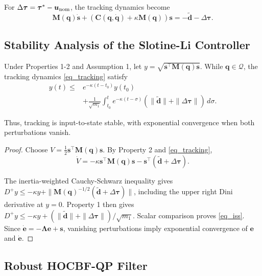 For $\Delta\bm\tau=\bm\tau^*-\bm u_{\rm nom}$, the tracking dynamics become
\begin{equation}
\bm M(\bm q)\dot{\bm s}+(\bm C(\bm q,\dot{\bm q})+\kappa\bm M(\bm q))\bm s
=-\tilde{\bm d}-\Delta\bm\tau.
\label{eq_tracking}
\end{equation}

\subsection{Stability Analysis of the Slotine-Li Controller}

\begin{theorem}
Under Properties 1-2 and Assumption 1, let
$y=\sqrt{\bm s^\top\bm M(\bm q)\bm s}$.
While $\bm q\in\mathcal Q$, the tracking dynamics
\eqref{eq_tracking} satisfy
\begin{equation}
\begin{aligned}
y(t)\le{}&e^{-\kappa(t-t_0)}y(t_0)\\
&+\frac{1}{\sqrt{m_1}}\int_{t_0}^{t}
e^{-\kappa(t-\sigma)}
(\|\tilde{\bm d}\|+\|\Delta\bm\tau\|)\,d\sigma.
\end{aligned}
\label{eq_iss}
\end{equation}

Thus, tracking is input-to-state stable, with
exponential convergence when both perturbations vanish.
\end{theorem}

\begin{proof}
Choose $V=\tfrac12\bm s^\top\bm M(\bm q)\bm s$.
By Property 2 and \eqref{eq_tracking},
\begin{equation}
\dot V=-\kappa\bm s^\top\bm M(\bm q)\bm s
-\bm s^\top(\tilde{\bm d}+\Delta\bm\tau).
\label{eq_slotine_lyap}
\end{equation}

The inertia-weighted Cauchy-Schwarz inequality gives
$D^+y\le-\kappa y+
\|\bm M(\bm q)^{-1/2}(\tilde{\bm d}+\Delta\bm\tau)\|$,
including the upper right Dini derivative at $y=0$.
Property 1 then gives
$D^+y\le-\kappa y+
(\|\tilde{\bm d}\|+\|\Delta\bm\tau\|)/\sqrt{m_1}$.
Scalar comparison proves \eqref{eq_iss}.
Since $\dot{\bm e}=-\bm\Lambda\bm e+\bm s$,
vanishing perturbations imply exponential
convergence of $\bm e$ and $\dot{\bm e}$.
\end{proof}

\subsection{Robust HOCBF-QP Filter}

